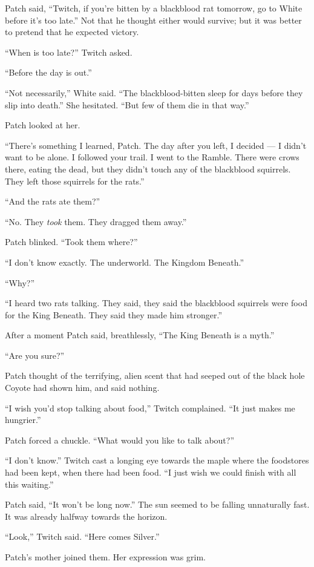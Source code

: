 \documentclass[12pt]{memoir}
\begin{document}
Patch said, “Twitch, if you’re bitten by a blackblood rat tomorrow, go
to White before it’s too late.” Not that he thought either would
survive; but it was better to pretend that he expected victory.

“When is too late?” Twitch asked.

“Before the day is out.”

“Not necessarily,” White said. “The blackblood-bitten sleep for days
before they slip into death.” She hesitated. “But few of them die in
that way.”

Patch looked at her.

“There’s something I learned, Patch. The day after you left, I decided
— I didn’t want to be alone. I followed your trail. I went to the
Ramble. There were crows there, eating the dead, but they didn’t touch
any of the blackblood squirrels. They left those squirrels for the
rats.”

“And the rats ate them?”

“No. They \textit{took} them. They dragged them away.”

Patch blinked. “Took them where?”

“I don’t know exactly. The underworld. The Kingdom Beneath.”

“Why?”

“I heard two rats talking. They said, they said the blackblood
squirrels were food for the King Beneath. They said they made him
stronger.”

After a moment Patch said, breathlessly, “The King Beneath is a myth.”

“Are you sure?”

Patch thought of the terrifying, alien scent that had seeped out of
the black hole Coyote had shown him, and said nothing.

“I wish you’d stop talking about food,” Twitch complained. “It just
makes me hungrier.”

Patch forced a chuckle. “What would you like to talk about?”

“I don’t know.” Twitch cast a longing eye towards the maple where the
foodstores had been kept, when there had been food. “I just wish we
could finish with all this waiting.”

Patch said, “It won’t be long now.” The sun seemed to be falling
unnaturally fast. It was already halfway towards the horizon.

“Look,” Twitch said. “Here comes Silver.”

Patch’s mother joined them. Her expression was grim.
\end{document}
